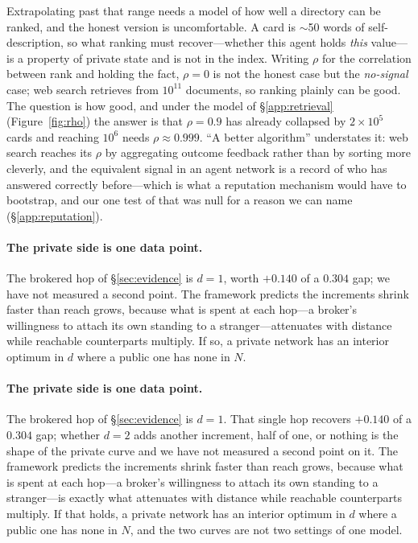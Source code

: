 Extrapolating past that range needs a model of how well a directory can be ranked, and the
honest version is uncomfortable. A card is $\sim$50 words of self-description, so what
ranking must recover---whether this agent holds \emph{this} value---is a property of
private state and is not in the index. Writing $\rho$ for the correlation between rank and
holding the fact, $\rho=0$ is not the honest case but the \emph{no-signal} case;
web search retrieves from $10^{11}$ documents, so ranking plainly can be good. The question
is how good, and under the model of \S\ref{app:retrieval} (Figure~\ref{fig:rho}) the answer
is that $\rho = 0.9$ has already collapsed by $2\times10^5$ cards and reaching $10^6$ needs
$\rho \approx 0.999$. ``A better algorithm'' understates it: web search reaches its $\rho$
by aggregating outcome feedback rather than by sorting more cleverly, and the equivalent
signal in an agent network is a record of who has answered correctly before---which is what
a reputation mechanism would have to bootstrap, and our one test of that was null for a
reason we can name (\S\ref{app:reputation}).

\ifcompact
\paragraph{The private side is one data point.} The brokered hop of \S\ref{sec:evidence} is
$d=1$, worth $+0.140$ of a $0.304$ gap; we have not measured a second point. The framework
predicts the increments shrink faster than reach grows, because what is spent at each
hop---a broker's willingness to attach its own standing to a stranger---attenuates with
distance while reachable counterparts multiply. If so, a private network has an interior
optimum in $d$ where a public one has none in $N$.
\else
\paragraph{The private side is one data point.} The brokered hop of \S\ref{sec:evidence} is
$d=1$. That single hop recovers $+0.140$ of a $0.304$ gap; whether $d=2$ adds another
increment, half of one, or nothing is the shape of the private curve and we have not
measured a second point on it. The framework predicts the increments shrink faster than
reach grows, because what is spent at each hop---a broker's willingness to attach its own
standing to a stranger---is exactly what attenuates with distance while reachable
counterparts multiply. If that holds, a private network has an interior optimum in $d$
where a public one has none in $N$, and the two curves are not two settings of one model.
\fi
